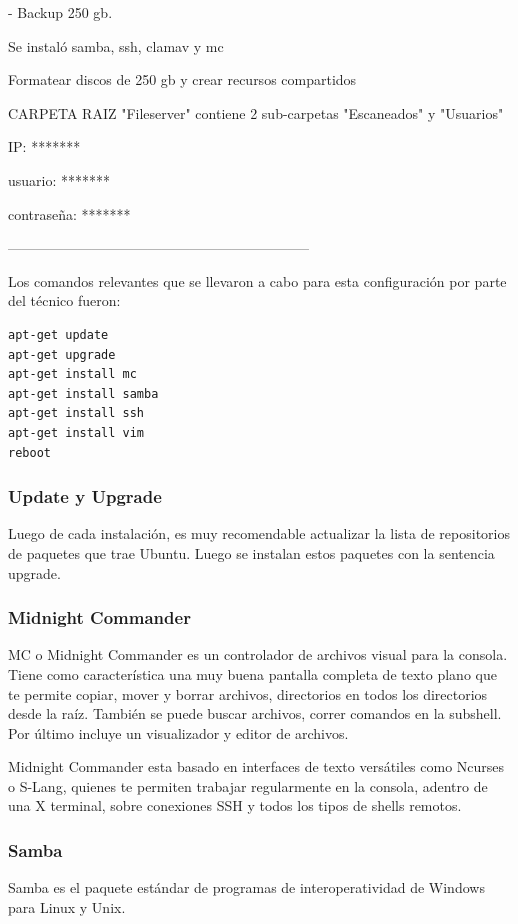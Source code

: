 \documentclass[12pt,a4paper]{article}
\begin{document}
- Backup 250 gb.

Se instaló samba, ssh, clamav y mc

Formatear discos de 250 gb y crear recursos compartidos 

CARPETA RAIZ "Fileserver" contiene 2 sub-carpetas "Escaneados" y "Usuarios"

IP: *******

usuario: *******

contraseña: *******

\begin{center}
-----------------------------------------------------------------
\end{center}

Los comandos relevantes que se llevaron a cabo para esta configuración por parte del técnico fueron:

\begin{lstlisting}
apt-get update
apt-get upgrade
apt-get install mc
apt-get install samba
apt-get install ssh
apt-get install vim
reboot 
\end{lstlisting}

\subsubsection{Update y Upgrade}
Luego de cada instalación, es muy recomendable actualizar la lista de repositorios de paquetes que trae Ubuntu. Luego se instalan estos paquetes con la sentencia upgrade.

\subsubsection{Midnight Commander}
MC o Midnight Commander es un controlador de archivos visual para la consola. Tiene como característica una muy buena pantalla completa de texto plano que te permite copiar, mover y borrar archivos, directorios en todos los directorios desde la raíz. También se puede buscar archivos, correr comandos en la subshell. Por último incluye un visualizador y editor de archivos.

Midnight Commander esta basado en interfaces de texto versátiles como Ncurses o S-Lang, quienes te permiten trabajar regularmente en la consola, adentro de una X terminal, sobre conexiones SSH y todos los tipos de shells remotos.\cite{MC}

\subsubsection{Samba}
Samba es el paquete estándar de programas de interoperatividad de Windows para Linux y Unix.
\end{document}
